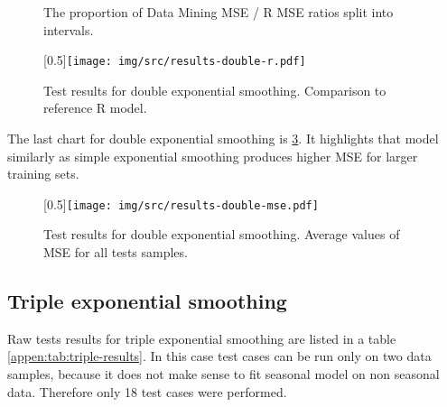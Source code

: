         \begin{figure}[H]
            \begin{center}
                \caption{The proportion of Data Mining MSE / R MSE ratios split into intervals.}
                \label{img:results-double-pie}
            \end{center}
        \end{figure}

        \begin{figure}[H]
            \begin{center}
                \scalebox{0.65}[0.5]{\texttt{[image: img/src/results-double-r.pdf]}}
                \caption{Test results for double exponential smoothing. Comparison to reference R model.}
                \label{img:results-double-r}
            \end{center}
        \end{figure}

        The last chart for double exponential smoothing is \ref{img:results-double-mse}.
        It highlights that model similarly as simple exponential smoothing produces higher MSE for larger training sets.

        \begin{figure}[H]
            \begin{center}
                \scalebox{0.65}[0.5]{\texttt{[image: img/src/results-double-mse.pdf]}}
                \caption{Test results for double exponential smoothing. Average values of MSE for all tests samples.}
                \label{img:results-double-mse}
            \end{center}
        \end{figure}

        \subsection{Triple exponential smoothing} \label{sec:results-triple}
        Raw tests results for triple exponential smoothing are listed in a table \ref{appen:tab:triple-results}. In
        this case test cases can be run only on two data samples, because it does not make sense to fit seasonal
        model on non seasonal data. Therefore only 18 test cases were performed.

